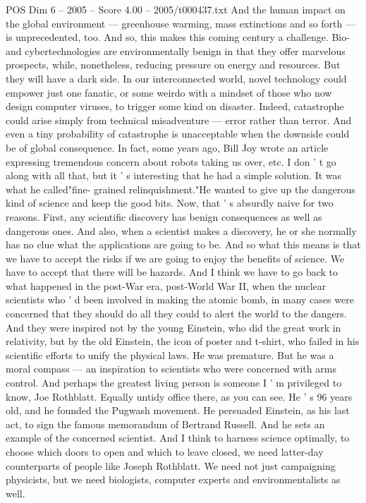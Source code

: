 \begin{textsample}{POS Dim 6 – 2005 – Score 4.00 – 2005/t000437.txt}
And the human impact on the global environment — greenhouse warming, mass extinctions and so forth — is unprecedented, too.
And so, this makes this coming century a challenge.
Bio- and cybertechnologies are environmentally benign in that they offer marvelous prospects, while, nonetheless, reducing pressure on energy and resources.
But they will have a dark side.
In our interconnected world, novel technology could empower just one fanatic, or some weirdo with a mindset of those who now design computer viruses, to trigger some kind on disaster.
Indeed, catastrophe could arise simply from technical misadventure — error rather than terror.
And even a tiny probability of catastrophe is unacceptable when the downside could be of global consequence.
In fact, some years ago, Bill Joy wrote an article expressing tremendous concern about robots taking us over, etc.
I don ' t go along with all that, but it ' s interesting that he had a simple solution.
It was what he called"fine- grained relinquishment."He wanted to give up the dangerous kind of science and keep the good bits.
Now, that ' s absurdly naive for two reasons.
First, any scientific discovery has benign consequences as well as dangerous ones.
And also, when a scientist makes a discovery, he or she normally has no clue what the applications are going to be.
And so what this means is that we have to accept the risks if we are going to enjoy the benefits of science.
We have to accept that there will be hazards.
And I think we have to go back to what happened in the post-War era, post-World War II, when the nuclear scientists who ' d been involved in making the atomic bomb, in many cases were concerned that they should do all they could to alert the world to the dangers.
And they were inspired not by the young Einstein, who did the great work in relativity, but by the old Einstein, the icon of poster and t-shirt, who failed in his scientific efforts to unify the physical laws.
He was premature.
But he was a moral compass — an inspiration to scientists who were concerned with arms control.
And perhaps the greatest living person is someone I ' m privileged to know, Joe Rothblatt.
Equally untidy office there, as you can see.
He ' s 96 years old, and he founded the Pugwash movement.
He persuaded Einstein, as his last act, to sign the famous memorandum of Bertrand Russell.
And he sets an example of the concerned scientist.
And I think to harness science optimally, to choose which doors to open and which to leave closed, we need latter-day counterparts of people like Joseph Rothblatt.
We need not just campaigning physicists, but we need biologists, computer experts and environmentalists as well.

\end{textsample}
